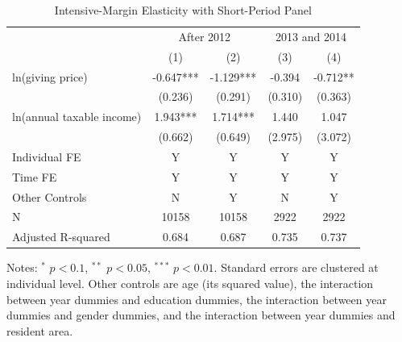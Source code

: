 \documentclass[
  11pt,
  a4paper,
]{article}
\begin{document}
\begin{table}

\caption{\label{tab:ShortIntensive}Intensive-Margin Elasticity with Short-Period Panel}
\centering
\fontsize{9}{11}\selectfont
\begin{threeparttable}
\begin{tabular}[t]{lcccc}
\toprule
\multicolumn{1}{c}{ } & \multicolumn{2}{c}{After 2012} & \multicolumn{2}{c}{2013 and 2014} \\
\cmidrule(l{3pt}r{3pt}){2-3} \cmidrule(l{3pt}r{3pt}){4-5}
 & (1) & (2) & (3) & (4)\\
\midrule
ln(giving price) & -0.647*** & -1.129*** & -0.394 & -0.712**\\
 & (0.236) & (0.291) & (0.310) & (0.363)\\
ln(annual taxable income) & 1.943*** & 1.714*** & 1.440 & 1.047\\
 & (0.662) & (0.649) & (2.975) & (3.072)\\
Individual FE & Y & Y & Y & Y\\
Time FE & Y & Y & Y & Y\\
Other Controls & N & Y & N & Y\\
N & 10158 & 10158 & 2922 & 2922\\
Adjusted R-squared & 0.684 & 0.687 & 0.735 & 0.737\\
\bottomrule
\end{tabular}
\begin{tablenotes}
\item Notes: $^{*}$ $p < 0.1$, $^{**}$ $p < 0.05$, $^{***}$ $p < 0.01$. Standard errors are clustered at individual level. Other controls are age (its squared value), the interaction between year dummies and education dummies, the interaction between year dummies and gender dummies, and the interaction between year dummies and resident area.
\end{tablenotes}
\end{threeparttable}
\end{table}
\end{document}
